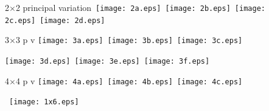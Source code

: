 \documentclass[12pt]{article}
\begin{document}

2$\times$2 principal variation\hfill\
\texttt{[image: 2a.eps]}\hfill\
\texttt{[image: 2b.eps]}\hfill\
\texttt{[image: 2c.eps]}\hfill\
\texttt{[image: 2d.eps]}\hfill~
\vfill

3$\times$3 p v\hfill
\texttt{[image: 3a.eps]}\hfill\
\texttt{[image: 3b.eps]}\hfill\
\texttt{[image: 3c.eps]}\hfill~
\vfill

\hfill
\texttt{[image: 3d.eps]}\hfill\
\texttt{[image: 3e.eps]}\hfill\
\texttt{[image: 3f.eps]}\hfill~
\vfill

4$\times$4 p v\hfill
\texttt{[image: 4a.eps]}\hfill\
\texttt{[image: 4b.eps]}\hfill\
\texttt{[image: 4c.eps]}\hfill~
\newpage

~\vfill\hfill\texttt{[image: 1x6.eps]}\hfill\vfill~

\end{document}

